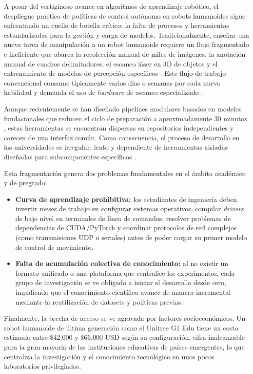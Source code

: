 \documentclass[stu,12pt,floatsintext]{apa7}
\begin{document}
A pesar del vertiginoso avance en algoritmos de aprendizaje robótico, el despliegue práctico de políticas de control autónomo en robots humanoides sigue enfrentando un cuello de botella crítico: la falta de procesos y herramientas estandarizadas para la gestión y carga de modelos. Tradicionalmente, enseñar una nueva tarea de manipulación a un robot humanoide requiere un flujo fragmentado e ineficiente que abarca la recolección manual de miles de imágenes, la anotación manual de cuadros delimitadores, el escaneo láser en 3D de objetos y el entrenamiento de modelos de percepción específicos \parencite{yan2026rapiddeployment}. Este flujo de trabajo convencional consume típicamente varios días o semanas por cada nueva habilidad y demanda el uso de \textit{hardware} de escaneo especializado \parencite{yan2026rapiddeployment}.

Aunque recientemente se han diseñado pipelines modulares basados en modelos fundacionales que reducen el ciclo de preparación a aproximadamente 30 minutos \parencite{yan2026rapiddeployment}, estas herramientas se encuentran dispersas en repositorios independientes y carecen de una interfaz común. Como consecuencia, el proceso de desarrollo en las universidades es irregular, lento y dependiente de herramientas aisladas diseñadas para subcomponentes específicos \parencite{cadene2026lerobotopensourcelibraryendtoend}.

Esta fragmentación genera dos problemas fundamentales en el ámbito académico y de pregrado:
\begin{itemize}
    \item \textbf{Curva de aprendizaje prohibitiva:} los estudiantes de ingeniería deben invertir meses de trabajo en configurar sistemas operativos, compilar \textit{drivers} de bajo nivel en terminales de línea de comandos, resolver problemas de dependencias de CUDA/PyTorch y coordinar protocolos de red complejos (como transmisiones UDP o seriales) antes de poder cargar su primer modelo de control de movimiento.
    \item \textbf{Falta de acumulación colectiva de conocimiento:} al no existir un formato unificado o una plataforma que centralice los experimentos, cada grupo de investigación se ve obligado a iniciar el desarrollo desde cero, impidiendo que el conocimiento científico avance de manera incremental mediante la reutilización de datasets y políticas previas.
\end{itemize}

Finalmente, la brecha de acceso se ve agravada por factores socioeconómicos. Un robot humanoide de última generación como el Unitree G1 Edu tiene un costo estimado entre \$42,000 y \$66,000 USD según su configuración, cifra inalcanzable para la gran mayoría de las instituciones educativas de países emergentes, lo que centraliza la investigación y el conocimiento tecnológico en unos pocos laboratorios privilegiados.
\end{document}
